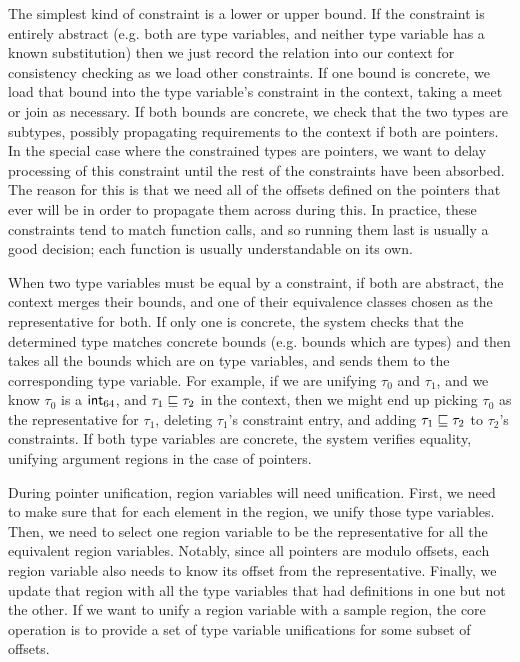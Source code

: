 The simplest kind of constraint is a lower or upper bound. If the constraint is entirely abstract (e.g. both are type variables, and neither type variable has a known substitution) then we just record the relation into our context for consistency checking as we load other constraints. If one bound is concrete, we load that bound into the type variable's constraint in the context, taking a meet or join as necessary. If both bounds are concrete, we check that the two types are subtypes, possibly propagating requirements to the context if both are pointers. In the special case where the constrained types are pointers, we want to delay processing of this constraint until the rest of the constraints have been absorbed. The reason for this is that we need all of the offsets defined on the pointers that ever will be in order to propagate them across during this. In practice, these constraints tend to match function calls, and so running them last is usually a good decision; each function is usually understandable on its own.

When two type variables must be equal by a constraint, if both are abstract, the context merges their bounds, and one of their equivalence classes chosen as the representative for both. If only one is concrete, the system checks that the determined type matches concrete bounds (e.g. bounds which are types) and then takes all the bounds which are on type variables, and sends them to the corresponding type variable. For example, if we are unifying $\tau_0$ and $\tau_1$, and we know $\tau_0$ is a $\mathsf{int}_{64}$, and $\tau_1 \sqsubseteq \tau_2$ in the context, then we might end up picking $\tau_0$ as the representative for $\tau_1$, deleting $\tau_1$'s constraint entry, and adding $\tau_1 \sqsubseteq \tau_2$ to $\tau_2$'s constraints. If both type variables are concrete, the system verifies equality, unifying argument regions in the case of pointers.

During pointer unification, region variables will need unification. First, we need to make sure that for each element in the region, we unify those type variables. Then, we need to select one region variable to be the representative for all the equivalent region variables. Notably, since all pointers are modulo offsets, each region variable also needs to know its offset from the representative. Finally, we update that region with all the type variables that had definitions in one but not the other. If we want to unify a region variable with a sample region, the core operation is to provide a set of type variable unifications for some subset of offsets.


